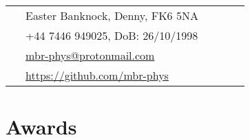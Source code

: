 \documentclass[10pt]{article} %
\begin{document}
\begin{paracol}{2}

\switchcolumn %


\parbox[top][0.12\textheight][c]{\linewidth}{ %
	\vspace{-0.04\textheight} %
	\colorbox{shade}{ %
		\begin{supertabular}{p{0.05\linewidth}|p{0.775\linewidth}} %
			\raisebox{-1pt}{\faHome} & Easter Banknock, Denny, FK6 5NA \\ %
			\raisebox{-1pt}{\faPhone} & +44 7446 949025, DoB: 26/10/1998 \\ %
            \raisebox{0pt}{\small\faEnvelope} & \href{mailto:mbr-phys@protonmail.com}{mbr-phys@protonmail.com}\\%
			\raisebox{-1pt}{\faGithub} & \href{https://github.com/mbr-phys}{https://github.com/mbr-phys} \\ %
		\end{supertabular}
	}
}


\section{Awards}


\end{paracol}
\end{document}
